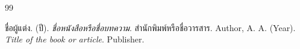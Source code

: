 \clearpage
\begin{thebibliography}{99}
ชื่อผู้แต่ง. (ปี). \textit{ชื่อหนังสือหรือชื่อบทความ}. สำนักพิมพ์หรือชื่อวารสาร.
Author, A. A. (Year). \textit{Title of the book or article}. Publisher.
\end{thebibliography}
